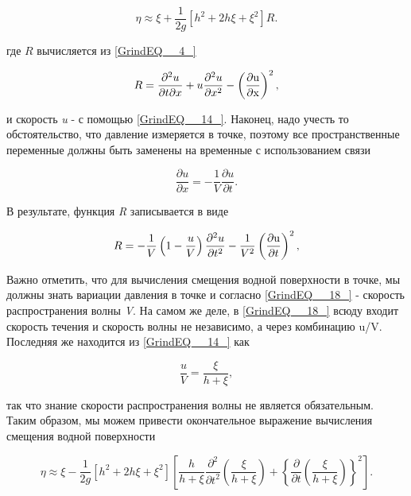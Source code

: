 \begin{equation} \label{GrindEQ__15_}
\eta \approx \xi +\frac{1}{2g} \left[h^{2} +2h\xi +\xi ^{2} \right]R.
\end{equation}


где $R$ вычисляется из \eqref{GrindEQ__4_}

\begin{equation} \label{GrindEQ__16_}
R=\frac{\partial ^{2} u}{\partial t\partial x} +u\frac{\partial ^{2} u}{\partial x^{2} } -\left(\frac{\partial {\rm u}}{\partial {\rm x}} \right)^{2} ,
\end{equation}


и скорость \textit{u} - с помощью \eqref{GrindEQ__14_}. Наконец, надо учесть то обстоятельство, что давление измеряется в точке, поэтому все пространственные переменные должны быть заменены на временные с использованием связи

\begin{equation} \label{GrindEQ__17_}
\frac{\partial u}{\partial x} =-\frac{1}{V} \frac{\partial u}{\partial t} .
\end{equation}


В результате, функция \textit{R} записывается в виде

\begin{equation} \label{GrindEQ__18_}
R=-\frac{1}{V} \left(1-\frac{u}{V} \right)\frac{\partial ^{2} u}{\partial t^{2} } -\frac{1}{V^{2} } \left(\frac{\partial {\rm u}}{\partial t} \right)^{2} ,
\end{equation}


Важно отметить, что для вычисления смещения водной поверхности в точке, мы должны знать вариации давления в точке и согласно \eqref{GrindEQ__18_} - скорость распространения волны \textit{V}. На самом же деле, в \eqref{GrindEQ__18_} всюду входит скорость течения и скорость волны не независимо, а через комбинацию u/V. Последняя же находится из \eqref{GrindEQ__14_} как


\begin{equation} \label{GrindEQ__19_}
\frac{u}{V} =\frac{\xi }{h+\xi } ,
\end{equation}


так что знание скорости распространения волны не является обязательным. Таким образом, мы можем привести окончательное выражение вычисления смещения водной поверхности


\begin{equation} \label{GrindEQ__20_}
\eta \approx \xi -\frac{1}{2g} \left[h^{2} +2h\xi +\xi ^{2} \right]\left[\frac{h}{h+\xi } \frac{\partial ^{2} }{\partial t^{2} } \left(\frac{\xi }{h+\xi } \right)+\left\{\frac{\partial }{\partial t} \left(\frac{\xi }{h+\xi } \right)\right\}^{2} \right].
\end{equation}


